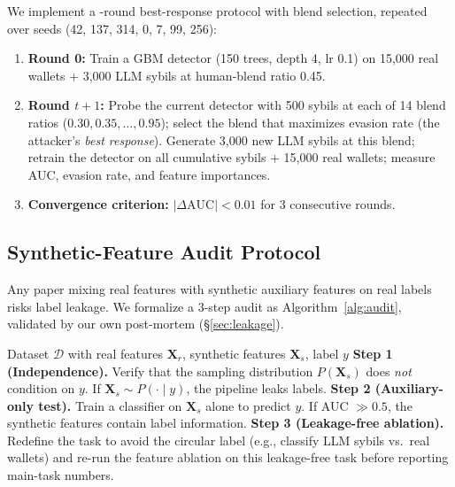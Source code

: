 \documentclass[sigconf,nonacm=false]{acmart}
\begin{document}
We implement a \bestResponseNRounds{}-round best-response protocol with blend selection, repeated over \bestResponseNSeeds{} seeds (42, 137, 314, 0, 7, 99, 256):
\begin{enumerate}
  \item \textbf{Round 0:} Train a GBM detector (150 trees, depth 4, lr 0.1) on 15,000 real wallets + 3,000 LLM sybils at human-blend ratio 0.45.
  \item \textbf{Round $t+1$:} Probe the current detector with 500 sybils at each of 14 blend ratios ($0.30, 0.35, \ldots, 0.95$); select the blend that maximizes evasion rate (the attacker's \emph{best response}). Generate 3,000 new LLM sybils at this blend; retrain the detector on all cumulative sybils + 15,000 real wallets; measure AUC, evasion rate, and feature importances.
  \item \textbf{Convergence criterion:} $|\Delta\text{AUC}|{<}0.01$ for 3 consecutive rounds.
\end{enumerate}

\subsection{Synthetic-Feature Audit Protocol}
\label{sec:methods:audit}

Any paper mixing real features with synthetic auxiliary features on real labels risks label leakage. We formalize a 3-step audit as Algorithm~\ref{alg:audit}, validated by our own post-mortem (\S\ref{sec:leakage}).

\begin{algorithm}[t]
\caption{Synthetic-Feature Audit Checklist}
\label{alg:audit}
\begin{algorithmic}[1]
\REQUIRE Dataset $\mathcal{D}$ with real features $\mathbf{X}_r$, synthetic features $\mathbf{X}_s$, label $y$
\STATE \textbf{Step 1 (Independence).} Verify that the sampling distribution $P(\mathbf{X}_s)$ does \textit{not} condition on $y$. If $\mathbf{X}_s \sim P(\cdot \mid y)$, the pipeline leaks labels.
\STATE \textbf{Step 2 (Auxiliary-only test).} Train a classifier on $\mathbf{X}_s$ alone to predict $y$. If AUC $\gg 0.5$, the synthetic features contain label information.
\STATE \textbf{Step 3 (Leakage-free ablation).} Redefine the task to avoid the circular label (e.g., classify LLM sybils vs.\ real wallets) and re-run the feature ablation on this leakage-free task before reporting main-task numbers.
\end{algorithmic}
\end{algorithm}
\end{document}
